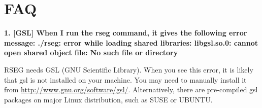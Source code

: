\documentclass[11pt]{report}
\begin{document}
\section{FAQ}
\label{sec:faq}

\textbf{1. [GSL] 
When I run the rseg command, it gives  the following error message: ./rseg:
error while loading shared libraries: libgsl.so.0: cannot open  shared object
file: No such file or directory}


RSEG needs GSL (GNU Scientific Library).  When you see this error, it is likely
that gsl is not installed on your machine. You may need to manually install it
from \url{http://www.gnu.org/software/gsl/}. Alternatively, there are
pre-compiled gsl packages on major Linux distribution, such as SUSE or UBUNTU.
\end{document}

